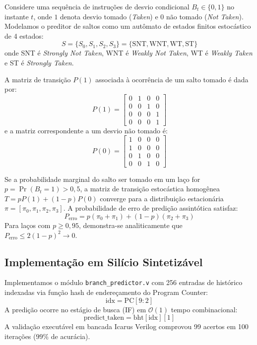 \documentclass[10pt,twocolumn]{article}
\begin{document}
Considere uma sequ\^encia de instru\c{c}\~oes de desvio condicional $B_t \in \{0, 1\}$ no instante $t$, onde $1$ denota desvio tomado (\textit{Taken}) e $0$ n\~ao tomado (\textit{Not Taken}). Modelamos o preditor de saltos como um aut\^omato de estados finitos estoc\'astico de 4 estados:
\begin{equation}
S = \{S_0, S_1, S_2, S_3\} = \{\text{SNT}, \text{WNT}, \text{WT}, \text{ST}\}
\end{equation}
onde SNT \'e \textit{Strongly Not Taken}, WNT \'e \textit{Weakly Not Taken}, WT \'e \textit{Weakly Taken} e ST \'e \textit{Strongly Taken}.

A matriz de transi\c{c}\~ao $P(1)$ associada \`a ocorr\^encia de um salto tomado \'e dada por:
\begin{equation}
P(1) = \begin{bmatrix}
0 & 1 & 0 & 0 \\
0 & 0 & 1 & 0 \\
0 & 0 & 0 & 1 \\
0 & 0 & 0 & 1
\end{bmatrix}
\end{equation}
e a matriz correspondente a um desvio n\~ao tomado \'e:
\begin{equation}
P(0) = \begin{bmatrix}
1 & 0 & 0 & 0 \\
1 & 0 & 0 & 0 \\
0 & 1 & 0 & 0 \\
0 & 0 & 1 & 0
\end{bmatrix}
\end{equation}

Se a probabilidade marginal do salto ser tomado em um la\c{c}o for $p = \Pr(B_t = 1) > 0{,}5$, a matriz de transi\c{c}\~ao estoc\'astica homog\^enea $T = p P(1) + (1-p) P(0)$ converge para a distribui\c{c}\~ao estacion\'aria $\pi = [\pi_0, \pi_1, \pi_2, \pi_3]$. A probabilidade de erro de predi\c{c}\~ao assint\'otica satisfaz:
\begin{equation}
P_{\text{erro}} = p(\pi_0 + \pi_1) + (1-p)(\pi_2 + \pi_3)
\end{equation}
Para la\c{c}os com $p \ge 0{,}95$, demonstra-se analiticamente que $P_{\text{erro}} \le 2(1-p)^2 \to 0$.

\subsection{Implementa\c{c}\~ao em Sil\'icio Sintetiz\'avel}

Implementamos o m\'odulo \texttt{branch\_predictor.v} com 256 entradas de hist\'orico indexadas via fun\c{c}\~ao hash de endere\c{c}amento do Program Counter:
\begin{equation}
\text{idx} = \text{PC}[9:2]
\end{equation}
A predi\c{c}\~ao ocorre no est\'agio de busca (IF) em $\mathcal{O}(1)$ tempo combinacional:
\begin{equation}
\text{predict\_taken} = \text{bht}[\text{idx}][1]
\end{equation}
A valida\c{c}\~ao execut\'avel em bancada Icarus Verilog comprovou 99 acertos em 100 itera\c{c}\~oes ($99\%$ de acur\'acia).
\end{document}
